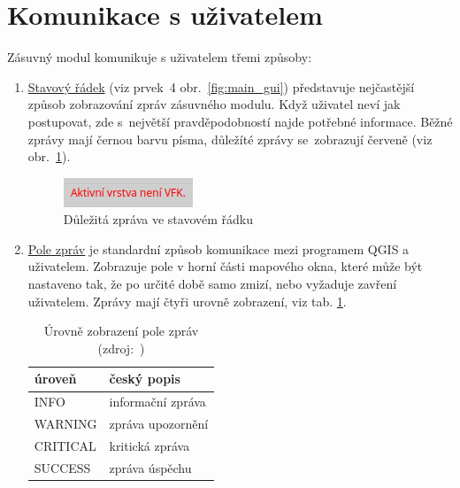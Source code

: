\section{Komunikace s uživatelem}
\label{komunikace}

Zásuvný modul komunikuje s uživatelem třemi způsoby:

\begin{enumerate}[leftmargin=1.5cm, noitemsep]
	\item \underline{Stavový řádek} (viz prvek~4 obr.~\ref{fig:main_gui}) představuje nejčastější způsob zobrazování zpráv zásuvného modulu. Když uživatel neví jak postupovat, zde s~největší pravděpodobností najde potřebné informace. Běžné zprávy mají černou barvu písma, důležíté zprávy se~zobrazují červeně (viz obr.~\ref{fig:dulezita_zprava}).
	
	\begin{figure}[H]
		\centering
		\includegraphics[width=.23\textwidth]{./pictures/statusbar-red_message.png}
		\caption[Důležitá zpráva ve stavovém řádku]{Důležitá zpráva ve stavovém řádku}
		\label{fig:dulezita_zprava}
 	\end{figure}	

	\item \underline{Pole zpráv} je standardní způsob komunikace mezi programem QGIS a uživatelem. Zobrazuje pole v horní části mapového okna, které může být nastaveno tak, že po určité době samo zmizí, nebo vyžaduje zavření uživatelem. Zprávy mají čtyři urovně zobrazení, viz tab. \ref{tab:urovne_pole_zprav}.

\begin{table}[H]
    \begin{tabular}{|l|l|}
        \hline
         úroveň & český popis \\
        \hline
        \hline
         INFO & informační zpráva \\ \hline
         WARNING & zpráva upozornění \\ \hline
         CRITICAL & kritická zpráva \\ \hline
         SUCCESS & zpráva úspěchu \\
         \hline
    \end{tabular}
    \centering
    \caption[Úrovně zobrazení pole zpráv]{Úrovně zobrazení pole zpráv (zdroj:~\citep{qgis_api})}
    \label{tab:urovne_pole_zprav}
\end{table}


\end{enumerate}
